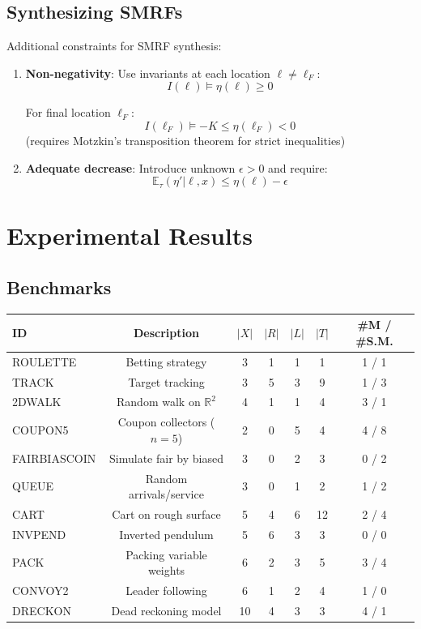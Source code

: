 \documentclass{article}
\begin{document}
\subsection{Synthesizing SMRFs}

Additional constraints for SMRF synthesis:

\begin{enumerate}
    \item \textbf{Non-negativity}: Use invariants at each location $\ell \neq \ell_F$:
    \begin{equation}
    I(\ell) \models \eta(\ell) \geq 0
    \end{equation}

    For final location $\ell_F$:
    \begin{equation}
    I(\ell_F) \models -K \leq \eta(\ell_F) < 0
    \end{equation}
    (requires Motzkin's transposition theorem for strict inequalities)

    \item \textbf{Adequate decrease}: Introduce unknown $\epsilon > 0$ and require:
    \begin{equation}
    \mathbb{E}_\tau(\eta' | \ell, x) \leq \eta(\ell) - \epsilon
    \end{equation}
\end{enumerate}

\section{Experimental Results}

\subsection{Benchmarks}

\begin{center}
\begin{tabular}{lcccccc}
\hline
ID & Description & $|X|$ & $|R|$ & $|L|$ & $|T|$ & \#M / \#S.M. \\
\hline
ROULETTE & Betting strategy & 3 & 1 & 1 & 1 & 1 / 1 \\
TRACK & Target tracking & 3 & 5 & 3 & 9 & 1 / 3 \\
2DWALK & Random walk on $\mathbb{R}^2$ & 4 & 1 & 1 & 4 & 3 / 1 \\
COUPON5 & Coupon collectors ($n=5$) & 2 & 0 & 5 & 4 & 4 / 8 \\
FAIRBIASCOIN & Simulate fair by biased & 3 & 0 & 2 & 3 & 0 / 2 \\
QUEUE & Random arrivals/service & 3 & 0 & 1 & 2 & 1 / 2 \\
CART & Cart on rough surface & 5 & 4 & 6 & 12 & 2 / 4 \\
INVPEND & Inverted pendulum & 5 & 6 & 3 & 3 & 0 / 0 \\
PACK & Packing variable weights & 6 & 2 & 3 & 5 & 3 / 4 \\
CONVOY2 & Leader following & 6 & 1 & 2 & 4 & 1 / 0 \\
DRECKON & Dead reckoning model & 10 & 4 & 3 & 3 & 4 / 1 \\
\hline
\end{tabular}
\end{center}
\end{document}
